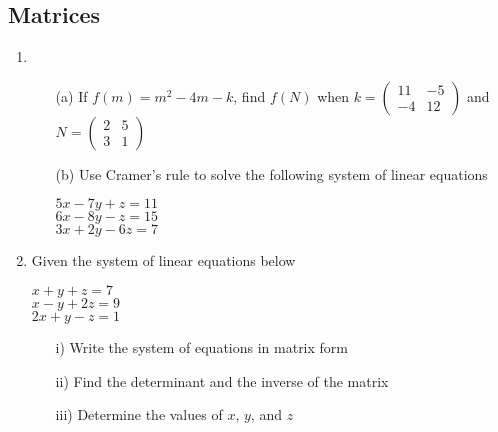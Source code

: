 \subsection{Matrices}

\begin{enumerate}
	\item
	\begin{enumerate}[topsep=0ex,itemsep=0ex,partopsep=1ex,parsep=1ex]
		\item[(a)] If $f(m) = m^2 - 4m - k$, find $f(N)$ when $k = \begin{pmatrix} 11 & -5 \\ -4 & 12 \end{pmatrix}$ and $N = \begin{pmatrix} 2 & 5 \\ 3 & 1 \end{pmatrix}$
		
		\item[(b)] Use Cramer's rule to solve the following system of linear equations
		\begin{center}
			$5x - 7y + z = 11$ \\
			$6x - 8y - z = 15$ \\
			$3x + 2y - 6z = 7$ 
		\end{center}
	\end{enumerate}
	
	\item Given the system of linear equations below
	\begin{center}
		$x + y + z = 7$ \\
		$x - y + 2z = 9$ \\
		$2x + y - z = 1$ 
	\end{center}
	\begin{enumerate}[topsep=0ex,itemsep=0ex,partopsep=1ex,parsep=1ex]
		\item[i)] Write the system of equations in matrix form
		\item[ii)] Find the determinant and the inverse of the matrix
		\item[iii)] Determine the values of $x$, $y$, and $z$
	\end{enumerate}
	

\end{enumerate}
